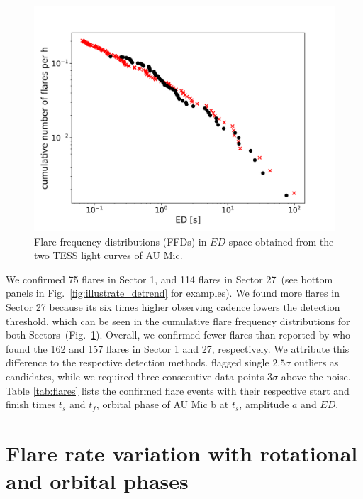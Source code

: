 \documentclass[fleqn,usenatbib,letters]{mnras}%
\begin{document}
\begin{figure}
\includegraphics[width=\hsize]{figures/2021_06_11_ffd.png} 
\caption{Flare frequency distributions (FFDs) in $ED$ space obtained from the two TESS light curves of AU Mic.}
\label{fig:ffd}
\end{figure}
We confirmed 75 flares in Sector 1, and 114 flares in Sector 27~(see bottom panels in Fig.~\ref{fig:illustrate_detrend} for examples). We found more flares in Sector 27 because its six times higher observing cadence lowers the detection threshold, which can be seen in the cumulative flare frequency distributions for both Sectors~(Fig.~\ref{fig:ffd}). Overall, we confirmed fewer flares than reported by \citet{martioli2021new} who found the 162 and 157 flares in Sector 1 and 27, respectively. We attribute this difference to the respective detection methods. \citet{martioli2021new} flagged single $2.5\sigma$ outliers as candidates, while we required three consecutive data points $3\sigma$ above the noise. Table \ref{tab:flares} lists the confirmed flare events with their respective start and finish times $t_s$ and $t_f$, orbital phase of AU Mic b at $t_s$, amplitude $a$ and $ED$.

\section{Flare rate variation with rotational and orbital phases}
\label{sec:phases}


\end{document}

